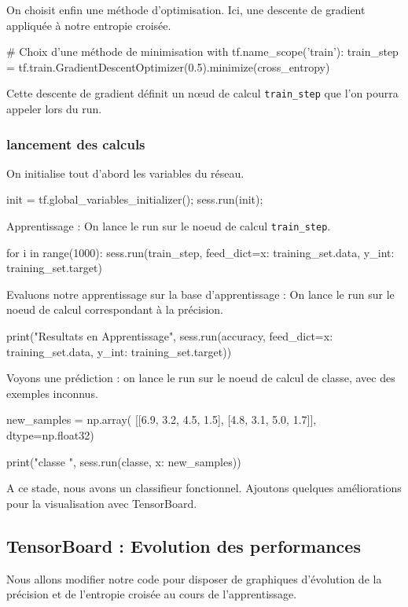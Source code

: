 \documentclass[a4paper,11pt]{book}
\begin{document}
On choisit enfin une méthode d'optimisation. Ici, une descente de gradient appliquée à notre entropie croisée.
\begin{mypython}
# Choix d'une méthode de minimisation
with tf.name_scope('train'):
	train_step = tf.train.GradientDescentOptimizer(0.5).minimize(cross_entropy)
\end{mypython}
Cette descente de gradient définit un nœud de calcul \verb+train_step+ que l'on pourra appeler lors du run.

\subsubsection{lancement des calculs}
On initialise tout d'abord les variables du réseau.
\begin{mypython}
init = tf.global_variables_initializer();
sess.run(init);
\end{mypython}

Apprentissage : On lance le run sur le noeud de calcul \verb+train_step+.
\begin{mypython}
for i in range(1000):
  sess.run(train_step, feed_dict={x: training_set.data, y_int: training_set.target})
\end{mypython}

Evaluons notre apprentissage sur la base d'apprentissage : On lance le run sur le noeud de calcul correspondant à la précision. 
\begin{mypython}
print("Resultats en Apprentissage", sess.run(accuracy, feed_dict={x: training_set.data, y_int: training_set.target}))
\end{mypython}

Voyons une prédiction : on lance le run sur le noeud de calcul de classe, avec des exemples inconnus.
\begin{mypython}
new_samples = np.array(
  [[6.9, 3.2, 4.5, 1.5],
   [4.8, 3.1, 5.0, 1.7]], dtype=np.float32)
  
print("classe ", sess.run(classe, {x: new_samples}))
\end{mypython}

A ce stade, nous avons un classifieur fonctionnel.
Ajoutons quelques améliorations pour la visualisation avec TensorBoard.

\subsection{TensorBoard : Evolution des performances}
Nous allons modifier notre code pour disposer de graphiques d'évolution de la précision et de l'entropie croisée au cours de l'apprentissage.
\end{document}

